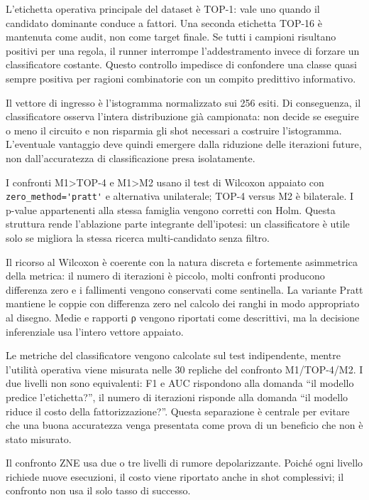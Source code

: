 L'etichetta operativa principale del dataset è TOP-1: vale uno quando il candidato dominante conduce a fattori. Una seconda etichetta TOP-16 è mantenuta come audit, non come target finale. Se tutti i campioni risultano positivi per una regola, il runner interrompe l'addestramento invece di forzare un classificatore costante. Questo controllo impedisce di confondere una classe quasi sempre positiva per ragioni combinatorie con un compito predittivo informativo.

Il vettore di ingresso è l'istogramma normalizzato sui 256 esiti. Di conseguenza, il classificatore osserva l'intera distribuzione già campionata: non decide se eseguire o meno il circuito e non risparmia gli shot necessari a costruire l'istogramma. L'eventuale vantaggio deve quindi emergere dalla riduzione delle iterazioni future, non dall'accuratezza di classificazione presa isolatamente.

I confronti M1\textgreater TOP-4 e M1\textgreater M2 usano il test di Wilcoxon appaiato con \verb|zero_method='pratt'| e alternativa unilaterale; TOP-4 versus M2 è bilaterale. I p-value appartenenti alla stessa famiglia vengono corretti con Holm. Questa struttura rende l'ablazione parte integrante dell'ipotesi: un classificatore è utile solo se migliora la stessa ricerca multi-candidato senza filtro.

Il ricorso al Wilcoxon è coerente con la natura discreta e fortemente asimmetrica della metrica: il numero di iterazioni è piccolo, molti confronti producono differenza zero e i fallimenti vengono conservati come sentinella. La variante Pratt mantiene le coppie con differenza zero nel calcolo dei ranghi in modo appropriato al disegno. Medie e rapporti ρ vengono riportati come descrittivi, ma la decisione inferenziale usa l'intero vettore appaiato.

Le metriche del classificatore vengono calcolate sul test indipendente, mentre l'utilità operativa viene misurata nelle 30 repliche del confronto M1/TOP-4/M2. I due livelli non sono equivalenti: F1 e AUC rispondono alla domanda ``il modello predice l'etichetta?'', il numero di iterazioni risponde alla domanda ``il modello riduce il costo della fattorizzazione?''. Questa separazione è centrale per evitare che una buona accuratezza venga presentata come prova di un beneficio che non è stato misurato.

Il confronto ZNE usa due o tre livelli di rumore depolarizzante. Poiché ogni livello richiede nuove esecuzioni, il costo viene riportato anche in shot complessivi; il confronto non usa il solo tasso di successo.

